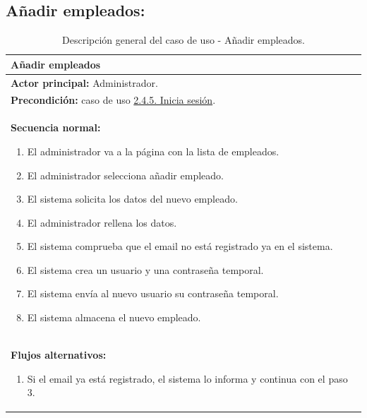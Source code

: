 \documentclass[12pt, a4paper, twoside]{report}
\begin{document}
        \subsection{Añadir empleados:}
            \begin{table}[H]
            \centering
            \begin{tabular}{|p{16cm}|} 
            \hline
            \textbf{Añadir empleados} \\ \hline
            \textbf{Actor principal:} Administrador. \\ \hline
            \textbf{Precondición:} caso de uso \hyperref[subsec:2.4.5.]{2.4.5. Inicia sesión}. \\ \hline
            \textbf{Secuencia normal:}
                \begin{enumerate}
                    \item El administrador va a la página con la lista de empleados.
                    \item El administrador selecciona añadir empleado.
                    \item El sistema solicita los datos del nuevo empleado.
                    \item El administrador rellena los datos.
                    \item El sistema comprueba que el email no está registrado ya en el sistema.
                    \item El sistema crea un usuario y una contraseña temporal.
                    \item El sistema envía al nuevo usuario su contraseña temporal.
                    \item El sistema almacena el nuevo empleado.
                \end{enumerate} \\ \hline
            \textbf{Flujos alternativos:}
                \begin{enumerate}
                    \item[5.a.] Si el email ya está registrado, el sistema lo informa y continua con el paso 3.
                \end{enumerate} \\ \hline
            \end{tabular}
            \caption{Descripción general del caso de uso - Añadir empleados.}
            \end{table}
\end{document}
